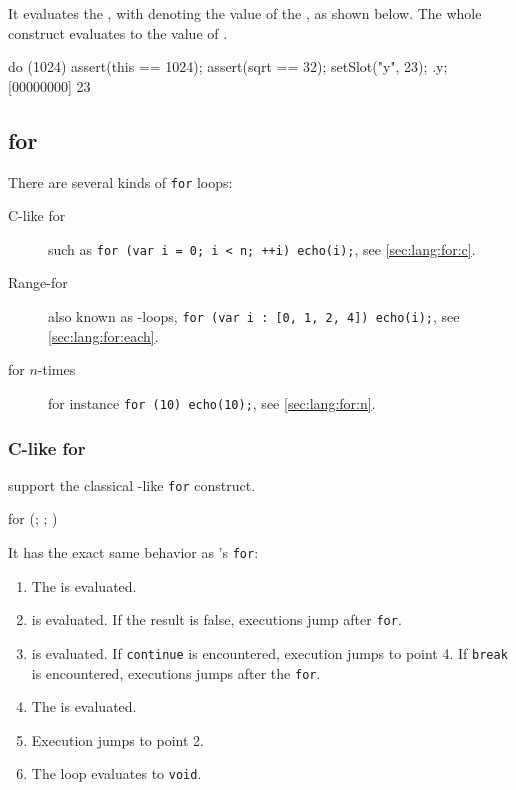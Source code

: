 
It evaluates the , with \this denoting the value of the
, as shown below.  The whole construct evaluates to the
value of .

\begin{urbiscript}
do (1024)
{
  assert(this == 1024);
  assert(sqrt == 32);
  setSlot("y", 23);
}.y;
[00000000] 23
\end{urbiscript}




\subsection{for}
\label{sec:lang:for}
There are several kinds of \lstinline|for| loops:
\begin{description}
\item[C-like for] such as
  \lstinline|for (var i = 0; i < n; ++i) echo(i);|, see
  \autoref{sec:lang:for:c}.
\item[Range-for] also known as -loops,
  \lstinline|for (var i : [0, 1, 2, 4]) echo(i);|, see
  \autoref{sec:lang:for:each}.
\item[for $n$-times] for instance \lstinline|for (10) echo(10);|, see
  \autoref{sec:lang:for:n}.
\end{description}

\subsubsection{C-like for}
\label{sec:lang:for:c}

\us support the classical \langC-like \lstinline|for| construct.

\begin{urbiunchecked}
for (; ; )
\end{urbiunchecked}

It has the exact same behavior as \langC's \lstinline|for|:

\begin{enumerate}
\item The  is evaluated.
\item {} is evaluated. If the result is false, executions
  jump after \lstinline|for|.
\item {} is evaluated. If \lstinline|continue| is encountered,
  execution jumps to point 4. If \lstinline|break| is encountered,
  executions jumps after the \lstinline|for|.
\item The  is evaluated.
\item Execution jumps to point 2.
\item The loop evaluates to \lstinline|void|.
\end{enumerate}

